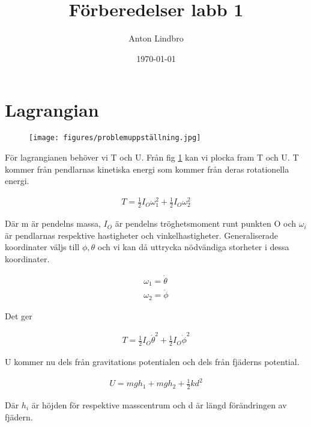 \documentclass[a4paper]{article}
\title{Förberedelser labb 1}
\author{Anton Lindbro}
\date{\today}
\begin{document}
\maketitle

\section{Lagrangian}

\begin{figure}[H]
    \begin{small}
        \begin{center}
            \texttt{[image: figures/problemuppställning.jpg]}
        \end{center}
        \caption{}
        \label{fig:uppställning}
    \end{small}
\end{figure}


För lagrangianen behöver vi T och U. Från fig \ref{fig:uppställning} kan vi plocka fram T och U.
T kommer från pendlarnas kinetiska energi som kommer från deras rotationella energi. 

\begin{align}
    T = \frac{1}{2}I_O\omega_1^2 + \frac{1}{2}I_O\omega_2^2
\end{align}

Där m är pendelns massa, $I_O$ är pendelns tröghetsmoment runt punkten O och $\omega_i$ är pendlarnas respektive hastigheter och vinkelhastigheter. Generaliserade koordinater väljs till $\phi, \theta$ och vi kan då uttrycka nödvändiga storheter i dessa koordinater.

\begin{align}
    \omega_1 = \dot{\theta} \\
    \omega_2 = \dot{\phi}
\end{align}

Det ger 

\begin{align}
    T =  \frac{1}{2}I_O\dot{\theta}^2 + \frac{1}{2}I_O\dot{\phi}^2
\end{align}

U kommer nu dels från gravitations potentialen och dels från fjäderns potential.

\begin{align}
    U = mgh_1 + mgh_2 + \frac{1}{2}kd^2
\end{align}

Där $h_i$ är höjden för respektive masscentrum och d är längd förändringen av fjädern.
\end{document}
